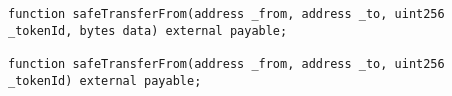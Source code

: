 \begin{lstlisting}[language=Solidity]
function safeTransferFrom(address _from, address _to, uint256 _tokenId, bytes data) external payable;

function safeTransferFrom(address _from, address _to, uint256 _tokenId) external payable;
\end{lstlisting}